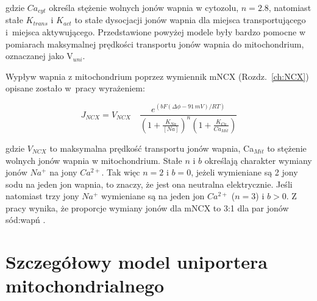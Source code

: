 \noindent gdzie $Ca_{cyt}$ określa stężenie wolnych jonów wapnia w cytozolu, $n=2.8$, natomiast stałe $K_{trans}$ i $K_{act}$ to stałe dysocjacji jonów wapnia dla miejsca transportującego i~miejsca aktywującego. Przedstawione powyżej modele były bardzo pomocne w pomiarach maksymalnej prędkości transportu jonów wapnia do mitochondrium, oznaczanej jako V$_{uni}$.



Wypływ wapnia z mitochondrium poprzez wymiennik mNCX (Rozdz.~\ref{ch:NCX}) opisane zostało w~pracy \cite{Magnus1998} wyrażeniem:

\begin{equation}
{ J }_{NCX}={ V }_{ NCX }\quad \frac { { e }^{ \left( { bF\left( \Delta \phi -91\, mV \right)  }/{ RT } \right)  } }{ { \left( 1+\frac { { K }_{ Na } }{ [Na] }  \right)  }^{ n }\left( 1+\frac { { K }_{ Ca } }{ Ca_{Mit} }  \right)  }
\end{equation}

\noindent gdzie $V_{NCX}$ to maksymalna prędkość transportu jonów wapnia, Ca$_{Mit}$ to stężenie wolnych jonów wapnia w mitochondrium. Stałe $n$ i $b$ określają charakter wymiany jonów $Na^+$ na jony $Ca^{2+}$. Tak więc $n=2$ i $b=0$, jeżeli wymieniane są 2 jony sodu na jeden jon wapnia, to znaczy, że jest ona neutralna elektrycznie. Jeśli natomiast trzy jony $Na^+$ wymieniane są na jeden jon $Ca^{2+}$ ($n=3$) i $b>0$. Z pracy \cite{Pradhan2010} wynika, że proporcje wymiany jonów dla mNCX to 3:1 dla par jonów sód:wapń \cite{Pradhan2010}.


\section{Szczegółowy model uniportera mitochondrialnego}

